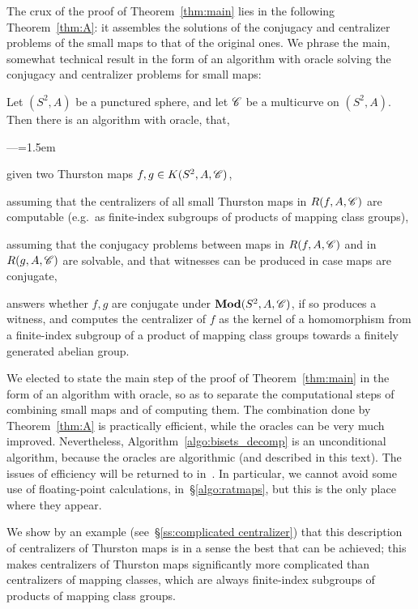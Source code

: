 \documentclass{amsart}
\begin{document}
The crux of the proof of Theorem~\ref{thm:main} lies in the following
Theorem~\ref{thm:A}: it assembles the solutions of the conjugacy and
centralizer problems of the small maps to that of the original
ones. We phrase the main, somewhat technical result in the form of an
algorithm with oracle solving the conjugacy and centralizer problems
for small maps:
\begin{mainthm}\label{thm:A}
  Let $(S^2,A)$ be a punctured sphere, and let ${\mathscr C}$ be a multicurve
  on $(S^2,A)$. Then there is an algorithm with oracle, that,
  \begin{list}{---}{\leftmargin=0pt\itemindent=1.5em}
  \item given two Thurston maps $f,g\in K(S^2,A,{\mathscr C})$,
  \item assuming that the centralizers of all small Thurston maps in
    $R(f,A,{\mathscr C})$ are computable (e.g.\ as
    finite-index subgroups of products of mapping class groups),
  \item assuming that the conjugacy problems between maps in
    $R(f,A,{\mathscr C})$ and in $R(g,A,{\mathscr C})$ are solvable, and that witnesses
    can be produced in case maps are conjugate,
  \end{list}
  answers whether $f,g$ are conjugate under $\mathbf{\relax Mod}(S^2,A,{\mathscr C})$, if so
  produces a witness, and computes the centralizer of $f$ as the
  kernel of a homomorphism from a finite-index subgroup of a product
  of mapping class groups towards a finitely generated abelian group.
\end{mainthm}
We elected to state the main step of the proof of
Theorem~\ref{thm:main} in the form of an algorithm with oracle, so as
to separate the computational steps of combining small maps and
of computing them. The combination done by Theorem~\ref{thm:A} is
practically efficient, while the oracles can be very much
improved. Nevertheless, Algorithm~\ref{algo:bisets_decomp} is an
unconditional algorithm, because the oracles are algorithmic (and
described in this text). The issues of efficiency will be returned to
in~\cite{bartholdi-dudko:bc5}. In particular, we cannot avoid some use
of floating-point calculations, in~\S\ref{algo:ratmaps}, but this is the
only place where they appear.

We show by an example (see~\S\ref{ss:complicated centralizer}) that
this description of centralizers of Thurston maps is in a sense the
best that can be achieved; this makes centralizers of Thurston maps
significantly more complicated than centralizers of mapping classes,
which are always finite-index subgroups of products of mapping class
groups.
\end{document}
